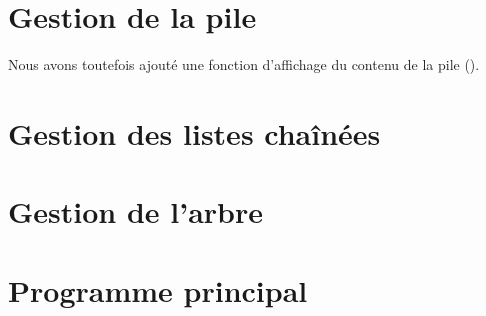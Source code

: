 \section{Gestion de la pile}
  Nous avons toutefois ajouté une fonction d'affichage du contenu de la pile ().
  \pagebreak

\newpage
\section{Gestion des listes chaînées}

\newpage
\section{Gestion de l'arbre}

\pagebreak
\section{Programme principal}
  \newpage
  \begin{turn}{90}
  	\begin{minipage}[c][18cm][c]{\textheight}
  	\end{minipage}
  \end{turn}